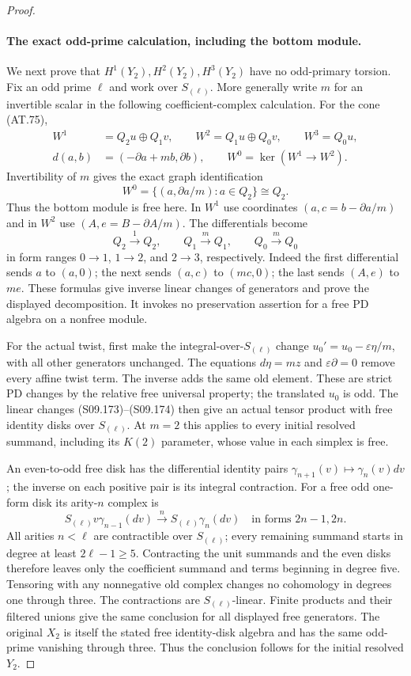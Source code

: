 \begin{proof}
\paragraph{The exact odd-prime calculation, including the bottom module.}
We next prove that $H^1(Y_2),H^2(Y_2),H^3(Y_2)$ have no
odd-primary torsion. Fix an odd prime $\ell$ and work over
$S_{(\ell)}$. More generally write $m$ for an invertible
scalar in the following coefficient-complex calculation.
For the cone (AT.75),
\[
 \begin{split}
 W^1&=Q_2u\oplus Q_1v,\qquad W^2=Q_1u\oplus Q_0v,\qquad
 W^3=Q_0u,\\
 d(a,b)&=(-\partial a+mb,\partial b),\qquad
 W^0=\ker(W^1\to W^2).
 \end{split}
\]
Invertibility of $m$ gives the exact graph identification
\[
 W^0=\{(a,\partial a/m):a\in Q_2\}\cong Q_2.
 \tag{S09.173}
\]
Thus the bottom module is free here. In $W^1$ use coordinates
$(a,c=b-\partial a/m)$ and in $W^2$ use
$(A,e=B-\partial A/m)$. The differentials become
\[
 Q_2\xrightarrow{1}Q_2,\qquad
 Q_1\xrightarrow{m}Q_1,\qquad
 Q_0\xrightarrow{m}Q_0
 \tag{S09.174}
\]
in form ranges $0\to1$, $1\to2$, and $2\to3$, respectively.
Indeed the first differential sends $a$ to $(a,0)$;
the next sends $(a,c)$ to $(mc,0)$; the last sends
$(A,e)$ to $me$. These formulas give inverse linear
changes of generators and prove the displayed decomposition.
It invokes no preservation assertion for a free PD algebra
on a nonfree module.

For the actual twist, first make the integral-over-$S_{(\ell)}$
change $u_0'=u_0-\varepsilon\eta/m$, with all other generators
unchanged. The equations $d\eta=mz$ and
$\varepsilon\partial=0$ remove every affine twist term.
The inverse adds the same old element. These are strict PD
changes by the relative free universal property; the translated
$u_0$ is odd. The linear changes (S09.173)--(S09.174) then give
an actual tensor product with free identity disks over
$S_{(\ell)}$. At $m=2$ this applies to every initial resolved
summand, including its $K(2)$ parameter, whose value in each
simplex is free.

An even-to-odd free disk has the differential identity pairs
$\gamma_{n+1}(v)\mapsto\gamma_n(v)dv$; the inverse on
each positive pair is its integral contraction.
For a free odd one-form disk its arity-$n$ complex is
\[
 S_{(\ell)}v\gamma_{n-1}(dv)
           \xrightarrow{\ n\ }S_{(\ell)}\gamma_n(dv)
 \quad\text{in forms }2n-1,2n.
 \tag{S09.175}
\]
All arities $n<\ell$ are contractible over $S_{(\ell)}$;
every remaining summand starts in degree at least
$2\ell-1\geq5$. Contracting the unit summands and the
even disks therefore leaves only the coefficient summand
and terms beginning in degree five. Tensoring with any
nonnegative old complex changes no cohomology in degrees
one through three. The contractions are $S_{(\ell)}$-linear.
Finite products and their filtered unions give the same
conclusion for all displayed free generators.
The original $X_2$ is itself the stated free identity-disk
algebra and has the same odd-prime vanishing through three.
Thus the conclusion follows for the initial resolved $Y_2$.


\end{proof}

